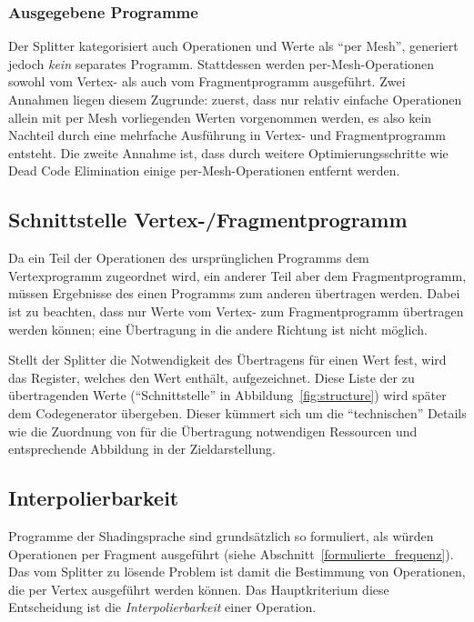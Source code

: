 \documentclass[twoside,a4paper,fleqn,12pt]{book}
\begin{document}
\subsubsection{Ausgegebene Programme}
Der Splitter kategorisiert auch Operationen und Werte als "`per Mesh"', generiert jedoch \emph{kein} separates Programm.
Stattdessen werden per-Mesh-Operationen sowohl vom Vertex- als auch vom Fragmentprogramm ausgeführt. Zwei Annahmen
liegen diesem Zugrunde: zuerst, dass nur relativ einfache Operationen allein mit per Mesh vorliegenden Werten vorgenommen werden, es also kein
Nachteil durch eine mehrfache Ausführung in Vertex- und Fragmentprogramm entsteht. Die zweite Annahme ist,
dass durch weitere Optimierungsschritte wie Dead Code Elimination einige per-Mesh-Operationen entfernt werden.


\subsection{Schnittstelle Vertex-/Fragmentprogramm}
\label{schnittstelle}

Da ein Teil der Operationen des ursprünglichen Programms dem Vertexprogramm zugeordnet wird, ein anderer Teil aber dem
Fragmentprogramm, müssen Ergebnisse des einen Programms zum anderen übertragen werden.
Dabei ist zu beachten, dass nur Werte vom Vertex- zum Fragmentprogramm übertragen werden können; %
eine Übertragung in die andere Richtung ist nicht möglich.

Stellt der Splitter die Notwendigkeit des Übertragens für einen Wert fest, wird das Register, welches den Wert enthält, aufgezeichnet.
Diese Liste der zu übertragenden Werte ("`Schnittstelle"' in Abbildung~\ref{fig:structure}) wird später dem Codegenerator übergeben.
Dieser kümmert sich um die "`technischen"' Details wie die Zuordnung von für die Übertragung notwendigen Ressourcen und %
entsprechende Abbildung in der Zieldarstellung.

\subsection{Interpolierbarkeit}
\label{Interpolierbarkeit}

Programme der Shadingsprache sind grundsätzlich so formuliert, als würden Operationen per Fragment ausgeführt (siehe Abschnitt~\ref{formulierte_frequenz}).
Das vom Splitter zu lösende Problem ist damit die Bestimmung von Operationen, die per Vertex ausgeführt werden können.
Das Hauptkriterium diese Entscheidung ist die \emph{Interpolierbarkeit} einer Operation.
\end{document}
